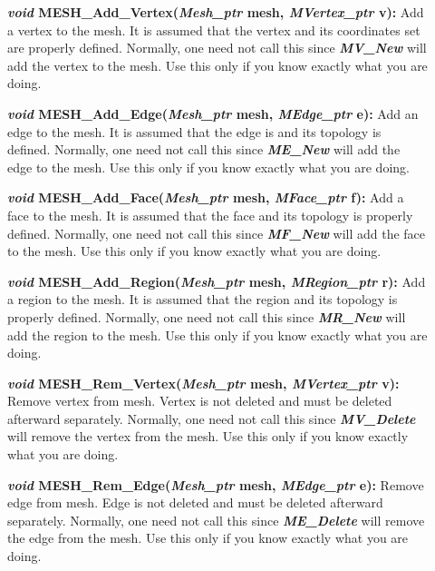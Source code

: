 \documentclass[12pt]{article}
\begin{document}
\begin{description}
\item[]

\item[]\textbf{\textit{void} MESH\_Add\_Vertex(\textit{Mesh\_ptr}
    mesh, \textit{MVertex\_ptr} v):} Add a vertex to the mesh. It is
  assumed that the vertex and its coordinates set are properly
  defined. Normally, one need not call this since
  \textbf{\textit{MV\_New}} will add the vertex to the mesh. Use this
  only if you know exactly what you are doing.

\item[]\textbf{\textit{void} MESH\_Add\_Edge(\textit{Mesh\_ptr} mesh,
    \textit{MEdge\_ptr} e):} Add an edge to the mesh. It is assumed
  that the edge is and its topology is defined. Normally, one need not
  call this since \textbf{\textit{ME\_New}} will add the edge to the
  mesh. Use this only if you know exactly what you are doing.

\item[]\textbf{\textit{void} MESH\_Add\_Face(\textit{Mesh\_ptr} mesh,
    \textit{MFace\_ptr} f):} Add a face to the mesh. It is assumed
  that the face and its topology is properly defined. Normally, one
  need not call this since \textbf{\textit{MF\_New}} will add the face
  to the mesh. Use this only if you know exactly what you are doing.

\item[]\textbf{\textit{void} MESH\_Add\_Region(\textit{Mesh\_ptr}
    mesh, \textit{MRegion\_ptr} r):} Add a region to the mesh. It is
  assumed that the region and its topology is properly defined.
  Normally, one need not call this since \textbf{\textit{MR\_New}}
  will add the region to the mesh. Use this only if you know exactly
  what you are doing.

\item[]\textbf{\textit{void} MESH\_Rem\_Vertex(\textit{Mesh\_ptr}
    mesh, \textit{MVertex\_ptr} v):} Remove vertex from mesh. Vertex
  is not deleted and must be deleted afterward separately. Normally,
  one need not call this since \textbf{\textit{MV\_Delete}} will
  remove the vertex from the mesh. Use this only if you know exactly
  what you are doing.

\item[]\textbf{\textit{void} MESH\_Rem\_Edge(\textit{Mesh\_ptr} mesh,
    \textit{MEdge\_ptr} e):} Remove edge from mesh. Edge is not
  deleted and must be deleted afterward separately. Normally, one need
  not call this since \textbf{\textit{ME\_Delete}} will remove the
  edge from the mesh. Use this only if you know exactly what you are
  doing.
  

\end{description}
\end{document}
